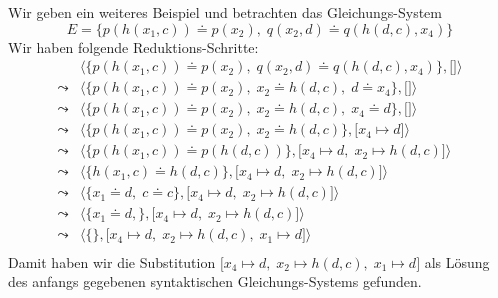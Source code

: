 \example
Wir geben ein weiteres Beispiel und betrachten das Gleichungs-System 
\[ E = \big\{ p(h(x_1,c)) \doteq p(x_2),\; q(x_2, d) \doteq q(h(d,c),x_4) \big\} \]
Wir haben folgende Reduktions-Schritte:
$$
\begin{array}{ll}
          & \big\langle \big\{ p(h(x_1,c)) \doteq p(x_2),\; q(x_2, d) \doteq q(h(d,c),x_4) \big\}, \big[ \big] \big\rangle \\[0.2cm]
 \leadsto & \big\langle \big\{ p(h(x_1,c)) \doteq p(x_2),\; x_2 \doteq h(d,c), \; d \doteq x_4 \big\}, \big[ \big] \big\rangle \\[0.2cm]
 \leadsto & \big\langle \big\{ p(h(x_1,c)) \doteq p(x_2),\; x_2 \doteq h(d,c), \; x_4 \doteq d \big\}, \big[ \big] \big\rangle \\[0.2cm]
 \leadsto & \big\langle \big\{ p(h(x_1,c)) \doteq p(x_2),\; x_2 \doteq h(d,c) \big\}, \big[ x_4 \mapsto d \big] \big\rangle \\[0.2cm]
 \leadsto & \big\langle \big\{ p(h(x_1,c)) \doteq p(h(d,c)) \big\}, \big[ x_4 \mapsto d,\; x_2 \mapsto h(d,c) \big] \big\rangle \\[0.2cm]
 \leadsto & \big\langle \big\{ h(x_1,c) \doteq h(d,c) \big\}, \big[ x_4 \mapsto d,\; x_2 \mapsto h(d,c) \big] \big\rangle \\[0.2cm]
 \leadsto & \big\langle \big\{ x_1 \doteq d,\; c \doteq c \big\}, \big[ x_4 \mapsto d,\; x_2 \mapsto h(d,c) \big] \big\rangle \\[0.2cm]
 \leadsto & \big\langle \big\{ x_1 \doteq d,\big\}, \big[ x_4 \mapsto d,\; x_2 \mapsto h(d,c) \big] \big\rangle \\[0.2cm]
 \leadsto & \big\langle \big\{\big\}, \big[ x_4 \mapsto d,\; x_2 \mapsto h(d,c),\; x_1 \mapsto d \big] \big\rangle \\[0.2cm]
\end{array}
$$
Damit haben wir die Substitution  $\big[ x_4 \mapsto d,\; x_2 \mapsto h(d,c),\; x_1 \mapsto d \big]$ als L\"{o}sung 
des anfangs gegebenen syntaktischen Gleichungs-Systems gefunden.  
\eox




